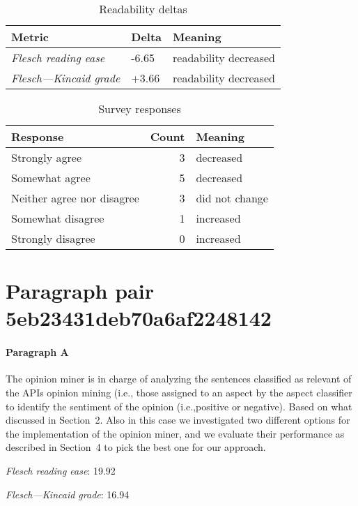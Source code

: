 \bigskip\begin{table}[!h]
\centering
\begin{tabular}{lll}
\toprule
               \textbf{Metric} & \textbf{Delta} &       \textbf{Meaning} \\
\midrule
    \emph{Flesch reading ease} &          -6.65 &  readability decreased \\
 \emph{Flesch---Kincaid grade} &          +3.66 &  readability decreased \\
\bottomrule
\end{tabular}
\caption*{Readability deltas}\end{table}

\begin{table}[!h]
\centering
\begin{tabular}{lrl}
\toprule
          \textbf{Response} &  \textbf{Count} & \textbf{Meaning} \\
\midrule
             Strongly agree &               3 &        decreased \\
             Somewhat agree &               5 &        decreased \\
 Neither agree nor disagree &               3 &   did not change \\
          Somewhat disagree &               1 &        increased \\
          Strongly disagree &               0 &        increased \\
\bottomrule
\end{tabular}
\caption*{Survey responses}\end{table}


\newpage
\section{Paragraph pair 5eb23431deb70a6af2248142}
\paragraph{Paragraph A}
The opinion miner is in charge of analyzing the sentences classified as relevant of the APIs opinion mining (i.e., those assigned to an aspect by the aspect classifier to identify the sentiment of the opinion (i.e.,positive or negative). Based on what discussed in Section 2. Also in this case we investigated two different options for the implementation of the opinion miner, and we evaluate their performance as described in Section 4 to pick the best one for our approach.\par\medskip
\emph{Flesch reading ease}: 19.92\par
\emph{Flesch---Kincaid grade}: 16.94

